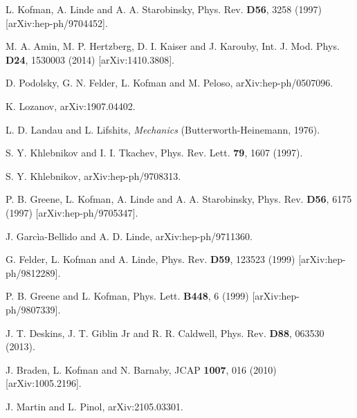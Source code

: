 \documentclass[11pt,a4paper,twoside]{book}
\begin{document}
\begin{thebibliography}{2}
	 L. Kofman, A. Linde and A. A. Starobinsky, Phys. Rev. \textbf{D56}, 3258 (1997) [arXiv:hep-ph/9704452].
	
	 M. A. Amin, M. P. Hertzberg, D. I. Kaiser and J. Karouby, Int. J.  Mod. Phys. \textbf{D24}, 1530003 (2014) [arXiv:1410.3808].
	
	 D. Podolsky, G. N. Felder, L. Kofman and M. Peloso,  arXiv:hep-ph/0507096.
	
	 K. Lozanov, arXiv:1907.04402.
	
	 L. D. Landau and L. Lifshits, \textit{Mechanics} (Butterworth-Heinemann, 1976).
	
	 S. Y. Khlebnikov and I. I. Tkachev, Phys. Rev. Lett. \textbf{79}, 1607 (1997).
	
	 S. Y. Khlebnikov, arXiv:hep-ph/9708313.
	
	 P. B. Greene, L. Kofman, A. Linde and A. A. Starobinsky, Phys. Rev. \textbf{D56}, 6175 (1997) [arXiv:hep-ph/9705347].
	
	 J. Garcìa-Bellido and A. D. Linde, arXiv:hep-ph/9711360.
	
	 G. Felder, L. Kofman and A. Linde, Phys. Rev. \textbf{D59}, 123523 (1999) [arXiv:hep-ph/9812289].
	
	 P. B. Greene and L. Kofman, Phys. Lett. \textbf{B448}, 6 (1999) [arXiv:hep-ph/9807339].
	
	 J. T. Deskins, J. T. Giblin Jr and R. R. Caldwell, Phys. Rev. \textbf{D88}, 063530 (2013).
	
	 J. Braden, L. Kofman and N. Barnaby, JCAP \textbf{1007}, 016 (2010) [arXiv:1005.2196].
	
	 J. Martin and L. Pinol, arXiv:2105.03301.
	
		
\end{thebibliography}	
	
\end{document}
